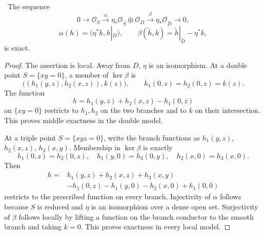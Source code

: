 \begin{lemma}
\label{lem:conductor-square}
\Verified\ The sequence
\[
0\longrightarrow\mathcal O_S
\xrightarrow{\alpha}
\eta_*\mathcal O_{\widetilde S}\oplus\mathcal O_D
\xrightarrow{\beta}
\eta_*\mathcal O_{\widetilde D}
\longrightarrow0,
\tag{5.5}
\]
\[
\alpha(h)=(\eta^*h,h|_D),\qquad
\beta(\widetilde h,k)=
\widetilde h|_{\widetilde D}-\eta^*k,
\]
is exact.
\end{lemma}

\begin{proof}
The assertion is local.  Away from $D$, $\eta$ is an isomorphism.
At a double point $S=\{xy=0\}$, a member of $\ker\beta$ is
\[
\bigl((h_1(y,z),h_2(x,z)),k(z)\bigr),
\qquad
h_1(0,z)=h_2(0,z)=k(z).
\]
The function
\[
h=h_1(y,z)+h_2(x,z)-h_1(0,z)
\]
on $\{xy=0\}$ restricts to $h_1,h_2$ on the two branches and to $k$ on
their intersection.  This proves middle exactness in the double model.

At a triple point $S=\{xyz=0\}$, write the branch functions as
$h_1(y,z)$, $h_2(x,z)$, $h_3(x,y)$.  Membership in $\ker\beta$ is exactly
\[
h_1(0,z)=h_2(0,z),\quad
h_1(y,0)=h_3(0,y),\quad
h_2(x,0)=h_3(x,0).
\]
Then
\[
\begin{split}
h={}&h_1(y,z)+h_2(x,z)+h_3(x,y)\\
&-h_1(0,z)-h_1(y,0)-h_2(x,0)+h_1(0,0)
\end{split}
\]
restricts to the prescribed function on every branch.  Injectivity of
$\alpha$ follows because $S$ is reduced and $\eta$ is an isomorphism over a
dense open set.  Surjectivity of $\beta$ follows locally by lifting a
function on the branch conductor to the smooth branch and taking $k=0$.
This proves exactness in every local model.
\end{proof}

